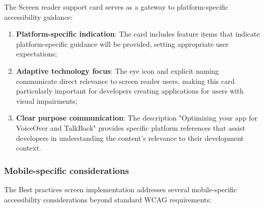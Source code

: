 The Screen reader support card serves as a gateway to platform-specific accessibility guidance:

\begin{enumerate}
    \item \textbf{Platform-specific indication}: The card includes feature items that indicate platform-specific guidance will be provided, setting appropriate user expectations;
    
    \item \textbf{Adaptive technology focus}: The eye icon and explicit naming communicate direct relevance to screen reader users, making this card particularly important for developers creating applications for users with visual impairments;
    
    \item \textbf{Clear purpose communication}: The description "Optimizing your app for VoiceOver and TalkBack" provides specific platform references that assist developers in understanding the content's relevance to their development context.
\end{enumerate}

\subsubsection{Mobile-specific considerations}

The Best practices screen implementation addresses several mobile-specific accessibility considerations beyond standard WCAG requirements:

